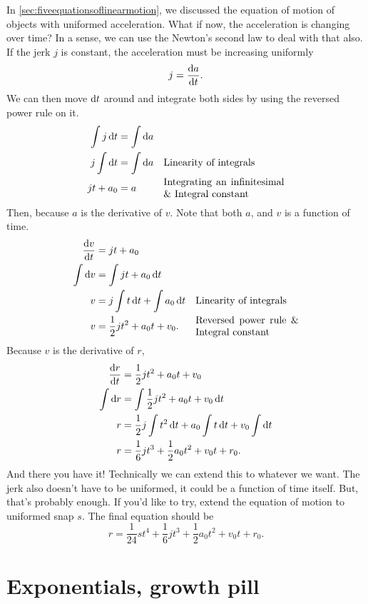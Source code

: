 In \cref{sec:fiveequationsoflinearmotion}, we discussed the equation of motion of objects with uniformed acceleration. What if now, the acceleration is changing over time? In a sense, we can use the Newton's second law to deal with that also. If the jerk $j$ is constant, the acceleration must be increasing uniformly
\begin{equation*}
    j = \odv{a}{t}.
\end{equation*}
We can then move $\odif{t}$ around and integrate both sides by using the reversed power rule on it.
\begin{align*}
    \int j\odif{t} &= \int\odif{a} \\
    j\int \odif{t} &= \int\odif{a} \alc[0.35]{Linearity of integrals} \\
    jt + a_0 &= a \alc[0.35]{Integrating an infinitesimal \& Integral constant}
\end{align*}
Then, because $a$ is the derivative of $v$. Note that both $a$, and $v$ is a function of time.
\begin{align*}
    \odv{v}{t} &= jt + a_0 \\
    \int \odif{v} &= \int jt + a_0 \odif{t} \\
    v &= j\int t\odif{t} + \int a_0\odif{t} \alc{Linearity of integrals} \\
    v &= \frac{1}{2}jt^2 + a_0t + v_0. \alc{Reversed power rule \& Integral constant} \\
\end{align*}
Because $v$ is the derivative of $r$,
\begin{align*}
    \odv{r}{t} &= \frac{1}{2}jt^2 + a_0t + v_0 \\
    \int \odif{r} &= \int\frac{1}{2}jt^2 + a_0t + v_0 \odif{t} \\
    r &= \frac{1}{2}j\int t^2\odif{t} + a_0\int t\odif{t} + v_0\int\odif{t} \\
    r &= \frac{1}{6}jt^3 + \frac{1}{2}a_0t^2 + v_0t + r_0.
\end{align*}
And there you have it! Technically we can extend this to whatever we want. The jerk also doesn't have to be uniformed, it could be a function of time itself. But, that's probably enough. If you'd like to try, extend the equation of motion to uniformed snap $s$. The final equation should be
\begin{equation*}
    r = \frac{1}{24}st^4 + \frac{1}{6}jt^3 + \frac{1}{2}a_0t^2 + v_0t + r_0.
\end{equation*}

\section{Exponentials, growth pill}


